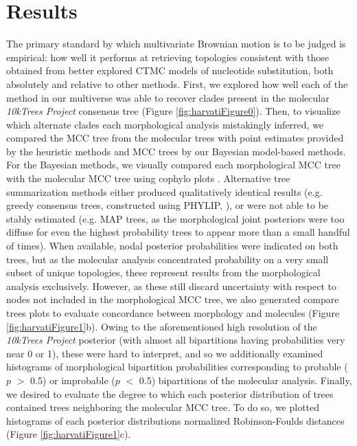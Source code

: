\documentclass[10pt, twocolumn, twoside]{article}
\begin{document}
\section*{Results}

The primary standard by which multivariate Brownian motion is to be judged is empirical: how well it performs at retrieving topologies consistent with those obtained from better explored CTMC models of nucleotide substitution, both absolutely and relative to other methods. First, we explored how well each of the method in our multiverse \citep{steegenIncreasingTransparencyMultiverse2016} was able to recover clades present in the molecular \emph{10kTrees Project} consensus tree (Figure \ref{fig:harvatiFigure0}). Then, to visualize which alternate clades each morphological analysis mistakingly inferred, we compared the MCC tree from the molecular trees with point estimates provided by the heuristic methods and MCC trees by our Bayesian model-based methods. For the Bayesian methods, we visually compared each morphological MCC tree with the molecular MCC tree using cophylo plots \citep[visible in Figure \ref{fig:harvatiFigure1}a]{revellPhytoolsPackagePhylogenetic2012}. Alternative tree summarization methods either produced qualitatively identical results (e.g. greedy consensus trees, constructed using PHYLIP, \citealp{felsensteinPHYLIPPhylogenyInference1993}), or were not able to be stably estimated (e.g. MAP trees, as the morphological joint posteriors were too diffuse for even the highest probability trees to appear more than a small handful of times). When available, nodal posterior probabilities were indicated on both trees, but as the molecular analysis concentrated probability on a very small subset of unique topologies, these represent results from the morphological analysis exclusively. However, as these still discard uncertainty with respect to nodes not included in the morphological MCC tree, we also generated compare trees plots to evaluate concordance between morphology and molecules (Figure \ref{fig:harvatiFigure1}b). Owing to the aforementioned high resolution of the \emph{10kTrees Project} posterior (with almost all bipartitions having probabilities very near 0 or 1), these were hard to interpret, and so we additionally examined histograms of morphological bipartition probabilities corresponding to probable ($p$ $>$ 0.5) or improbable ($p$ $<$ 0.5) bipartitions of the molecular analysis. Finally, we desired to evaluate the degree to which each posterior distribution of trees contained trees neighboring the molecular MCC tree. To do so, we plotted histograms of each posterior distributions normalized Robinson-Foulds distances (Figure \ref{fig:harvatiFigure1}c).
\end{document}
